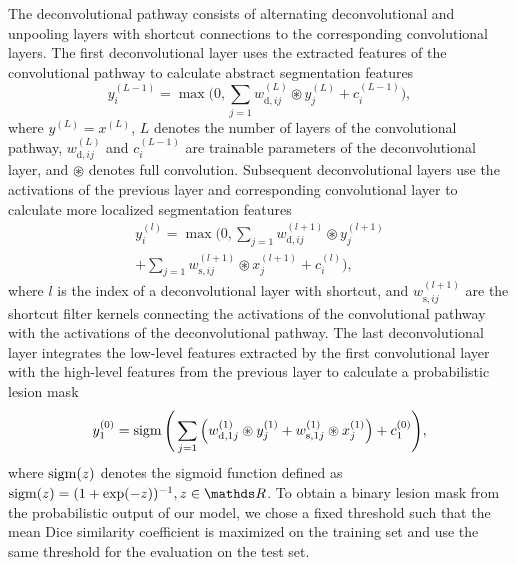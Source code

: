 The deconvolutional pathway consists of alternating deconvolutional and
unpooling layers with shortcut connections to the corresponding
convolutional layers. The first deconvolutional layer uses the extracted
features of the convolutional pathway to calculate abstract segmentation
features
\begin{equation}
y^{(L-1)}_i = \max\Bigg(0, \sum_{j=1}w^{(L)}_{\text{d},ij}\circledast
y^{(L)}_j + c^{(L-1)}_{i}\Bigg),
\end{equation}
where $y^{(L)} = x^{(L)}$, $L$ denotes the number of layers of the convolutional
pathway, $w^{(L)}_{\text{d},ij}$ and $c^{(L-1)}_i$ are trainable parameters of
the deconvolutional layer, and $\circledast$ denotes full convolution. Subsequent
deconvolutional layers use the activations of the previous layer
and corresponding convolutional layer to calculate more localized segmentation
features
\begin{multline}
y^{(l)}_i = \max\Bigg(0, 
\sum_{j=1}w^{(l+1)}_{\text{d},ij}\circledast y^{(l+1)}_j\\
+ \sum_{j=1} w^{(l+1)}_{\text{s},ij}\circledast x^{(l+1)}_j +
c^{(l)}_i\Bigg),
\end{multline}
where $l$ is the index of a deconvolutional layer with shortcut, and
$w^{(l+1)}_{\text{s},ij}$ are the shortcut filter kernels connecting the
activations of the convolutional pathway with the activations of the
deconvolutional pathway. The last deconvolutional layer integrates the low-level
features extracted by the first convolutional layer with the high-level features
from the previous layer to calculate a probabilistic lesion mask
\begin{equation}
y^{(0)}_1 = \operatorname{sigm}\Bigg(\sum_{j=1}\Big(w^{(1)}_{\text{d},1j}\circledast
y^{(1)}_j +
w^{(1)}_{\text{s},1j}\circledast x^{(1)}_j\Big) + c^{(0)}_1\Bigg),
\end{equation}
where $\operatorname{sigm}(z)$ denotes the sigmoid function defined as $\sigm(z) = (1 +
\exp(-z))^{-1}, z \in \R$. To obtain a binary lesion mask from the probabilistic
output of our model, we chose a fixed threshold such that the mean Dice
similarity coefficient \cite{dice1945measures} is maximized on the training set
and use the same threshold for the evaluation on the test set.

